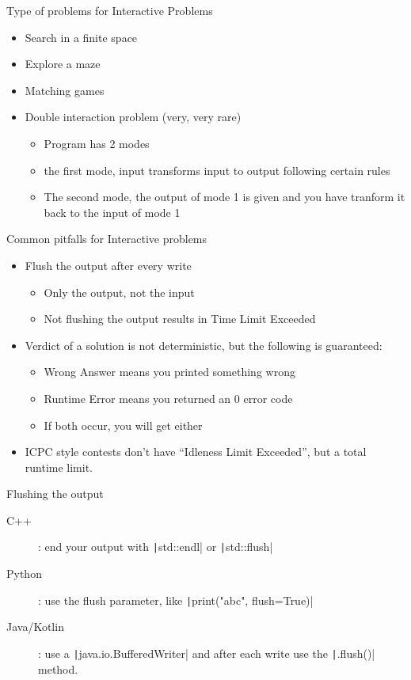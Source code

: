 \documentclass[11pt,pdf, aspectratio=169]{beamer}
\begin{document}
  \begin{frame}{Type of problems for Interactive Problems}
    \begin{itemize}
      \item Search in a finite space
      \item Explore a maze
      \item Matching games
      \item Double interaction problem (very, very rare)
      \begin{itemize}
        \item Program has 2 modes
        \item the first mode, input transforms input to output following certain rules
        \item The second mode, the output of mode 1 is given and you have tranform it back to the input of mode 1
      \end{itemize}
    \end{itemize}
  \end{frame}
  \begin{frame}{Common pitfalls for Interactive problems}
    \begin{itemize}
      \item Flush the output after every write
      \begin{itemize}
        \item Only the output, not the input
        \item Not flushing the output results in Time Limit Exceeded
      \end{itemize}
      \item Verdict of a solution is not deterministic, but the following is guaranteed:
      \begin{itemize}
        \item Wrong Answer means you printed something wrong
        \item Runtime Error means you returned an 0 error code
        \item If both occur, you will get either
      \end{itemize}
      \item ICPC style contests don't have ``Idleness Limit Exceeded'', but a total runtime limit.
    \end{itemize}
  \end{frame}
  \begin{frame}{Flushing the output}
    \begin{description}
      \item [C++]: end your output with \texttt|std::endl| or \texttt|std::flush|
      \item[Python]: use the flush parameter, like \texttt|print("abc", flush=True)|
      \item[Java/Kotlin]: use a \texttt|java.io.BufferedWriter| and after each write use the \texttt|.flush()| method.
    \end{description}
  \end{frame}
\end{document}
